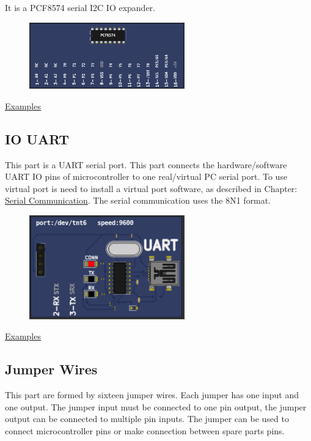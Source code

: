 It is a PCF8574 serial I2C IO expander.

\begin{figure}[H]
\center
\includegraphics[width=0.6\textwidth]{img/part_pcf8574.png} 
\end{figure} 

\href{https://lcgamboa.github.io/picsimlab_examples/Parts.html\#IO_PCF8574}{Examples}


\subsection{IO UART}

This part is a UART serial port. This part connects the hardware/software UART IO pins of microcontroller to
one real/virtual PC serial port. To use virtual port is need to install a virtual port software, as 
described in Chapter: \hyperlink{def:seriali}{Serial Communication}. 
The serial communication uses the 8N1 format.

\begin{figure}[H]
\center
\includegraphics[width=0.6\textwidth]{img/part_uart.png} 
\end{figure} 

\href{https://lcgamboa.github.io/picsimlab_examples/Parts.html\#IO_UART}{Examples}


\subsection{Jumper Wires}

This part are formed by sixteen jumper wires. Each jumper has one input and one output.  The jumper input must be connected to one pin output, 
the jumper output can be connected to multiple pin inputs. The jumper can be used to connect microcontroller pins or make connection between 
spare parts pins.   

